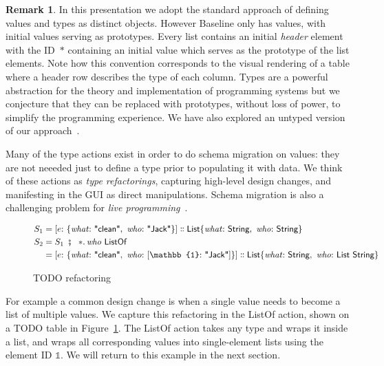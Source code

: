 \documentclass[english,submission]{programming}
\theoremstyle{definition}
\newtheorem*{remark}{Remark}
\newcommand{\mathbox}[1]{\colorbox{black!10}{$#1$}}
\DeclareMathOperator{\exec}{\ \fatsemi\ \ }
\newcommand{\is}{{:}\ }
\newcommand{\comma}{,\ }
\newcommand{\isa}{\dblcolon}
\newcommand{\quotedstring}[1]{\textsf{\textquotedbl{#1}\textquotedbl}}
\begin{document}
\begin{remark}
In this presentation we adopt the standard approach of defining values and types as distinct objects. However Baseline only has values, with initial values serving as prototypes. Every list contains an initial \textit{header} element with the ID~\mathbox{*} containing an initial value which serves as the prototype of the list elements. Note how this convention corresponds to the visual rendering of a table where a header row describes the type of each column. Types are a powerful abstraction for the theory and implementation of programming systems but we conjecture that they can be replaced with prototypes, without loss of power, to simplify the programming experience. We have also explored an untyped version of our approach~\cite{denicek}.
\end{remark}

Many of the type actions exist in order to do schema migration on values: they are not neeeded just to define a type prior to populating it with data. We think of these actions as \textit{type refactorings}, capturing high-level design changes, and manifesting in the GUI as direct manipulations. Schema migration is also a challenging problem for \textit{live programming}~\cite{challenge-problems}.
\begin{figure}[h]
\begin{align*}
  S_1 &= [
    e \is \{ \mathit{what}\is \quotedstring{clean}\comma  \mathit{who}\is \quotedstring{Jack} \}
    ] \isa
    \textsf{List}\{ \mathit{what}\is \textsf{String}\comma \mathit{who}\is \textsf{String} \}\\
S_2 &= S_1 \exec *\ldotp \mathit{who} \textsf{ ListOf } \\
 &= [
    e \is \{ \mathit{what}\is \quotedstring{clean}\comma  \mathit{who}\is [\mathbb{1}\is \quotedstring{Jack}] \}
    ] \isa
    \textsf{List}\{ \mathit{what}\is \textsf{String}\comma  \mathit{who}\is \textsf{List String} \}\\
\end{align*}
\vspace{-40pt}
\caption{TODO refactoring}
\label{fig:TODO-refactor}
\end{figure}

For example a common design change is when a single value needs to become a list of multiple values. We capture this refactoring in the \textsf{ListOf} action, shown on a TODO table in Figure~\ref{fig:TODO-refactor}.
The \textsf{ListOf} action takes any type and wraps it inside a list, and wraps all corresponding values into single-element lists using the element ID $\mathbb{1}$. We will return to this example in the next section.
\end{document}
